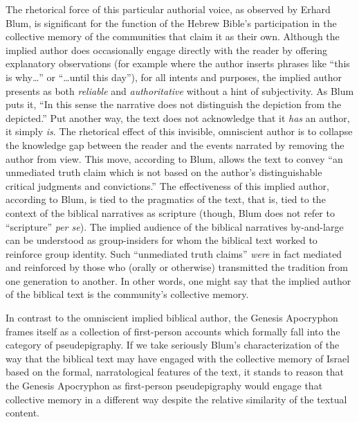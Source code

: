 The rhetorical force of this particular authorial voice, as observed by
Erhard Blum, is significant for the function of the Hebrew Bible's
participation in the collective memory of the communities that claim it
as their own. Although the implied author does occasionally engage
directly with the reader by offering explanatory observations (for
example where the author inserts phrases like ``this is why\ldots{}'' or
``\ldots{}until this day''), for all intents and purposes, the implied
author presents as both \emph{reliable} and \emph{authoritative} without
a hint of subjectivity. As Blum puts it, ``In this sense the narrative
does not distinguish the depiction from the
depicted.''\autocite[33]{blum_barton-etal2007} Put another way, the text
does not acknowledge that it \emph{has} an author, it simply \emph{is}.
The rhetorical effect of this invisible, omniscient author is to
collapse the knowledge gap between the reader and the events narrated by
removing the author from view. This move, according to Blum, allows the
text to convey ``an unmediated truth claim which is not based on the
author's distinguishable critical judgments and
convictions.''\autocite[33]{blum_barton-etal2007} The effectiveness of
this implied author, according to Blum, is tied to the pragmatics of the
text, that is, tied to the context of the biblical narratives as
scripture (though, Blum does not refer to ``scripture'' \emph{per se}).
The implied audience of the biblical narratives by-and-large can be
understood as group-insiders for whom the biblical text worked to
reinforce group identity. Such ``unmediated truth claims'' \emph{were}
in fact mediated and reinforced by those who (orally or otherwise)
transmitted the tradition from one generation to
another.\autocite[33]{blum_barton-etal2007} In other words, one might
say that the implied author of the biblical text is the community's
collective memory.\autocite[Blum writes, ``If we assume that the
traditional literature was primarily transmitted through oral means,
than the narrator who is speaking supplies the material with a personal
presence; he is not present as an author who judges and evaluates his
sources from a critical distance, but as a `transmitter' who
participates in the tradition itself and is able to lend it credence
through his own personality, his standing, and/or his
office.''][33]{blum_barton-etal2007}

In contrast to the omniscient implied biblical author, the
Genesis Apocryphon frames itself as a collection of first-person
accounts which formally fall into the category of pseudepigraphy. If we
take seriously Blum's characterization of the way that the biblical text
may have engaged with the collective memory of Israel based on the
formal, narratological features of the text, it stands to reason that
the Genesis Apocryphon as first-person pseudepigraphy would engage that
collective memory in a different way despite the relative similarity of
the textual content.

